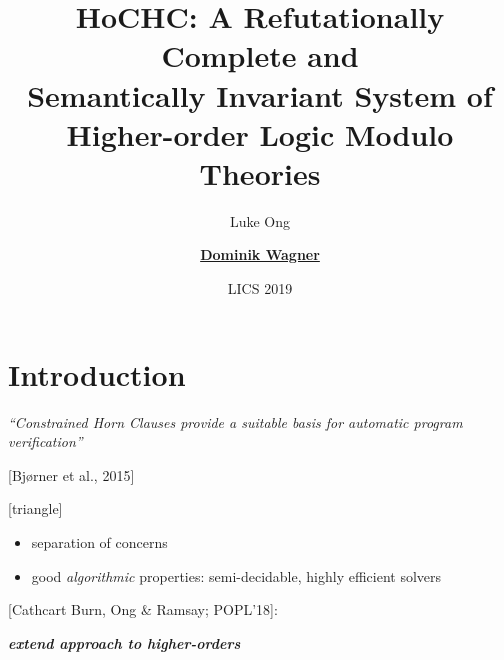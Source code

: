 \documentclass{beamer}
\begin{document}
\title[HoCHC]{
  \textbf{HoCHC: A Refutationally Complete and\\
    Semantically Invariant System of\\
    Higher-order Logic Modulo Theories}
}
\author{Luke Ong\and\textbf{ \underline{Dominik Wagner}}}
\date[LICS 2019]{LICS 2019}

\frame{\titlepage}

\section{Introduction}

\begin{frame}
  \hspace{-0.8cm}
    
  \textit{\LARGE\color{lighterblue}
    ``Constrained Horn Clauses provide a \emph{suitable} basis for automatic program verification''
  }

    \hspace{3.4cm}\hfill [Bj{\o}rner et al., 2015]

  [triangle]
  \vspace{1cm}
  {
    \begin{itemize}
    \item separation of concerns
    \item good \emph{algorithmic} properties: semi-decidable, highly efficient solvers
    \end{itemize}
  }
  
  \vspace{0.5cm}
  {[Cathcart Burn, Ong \& Ramsay; POPL'18]:

    {\large
    \textbf{\textit{\color{lighterblue}extend approach to \emph{higher-orders}}}}
  }

\end{frame}
\end{document}
